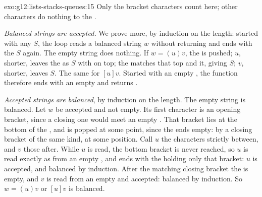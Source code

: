 \begin{solution}{exo:g12:lists-stacks-queues:15}
Only the bracket characters count here; other characters do nothing to the .

\emph{Balanced strings are accepted.} We prove more, by induction on the length: started with any  $S$, the loop
reads a balanced string $w$ without returning  and ends with the  $S$ again. The empty string does
nothing. If $w = (u)v$, the \code{(} is pushed; $u$, shorter, leaves the  as $S$ with \code{(} on top; the
\code{)} matches that top and  it, giving $S$; $v$, shorter, leaves $S$. The same for $[u]v$. Started with an
empty , the function therefore ends with an empty  and returns .

\emph{Accepted strings are balanced}, by induction on the length. The empty string is balanced. Let $w$ be accepted
and not empty. Its first character is an opening bracket, since a closing one would meet an empty . That bracket
lies at the bottom of the , and is popped at some point, since the  ends empty: by a closing bracket of the
same kind, at some position. Call $u$ the characters strictly between, and $v$ those after. While $u$ is read, the
bottom bracket is never reached, so $u$ is read exactly as from an empty , and ends with the  holding only
that bracket: $u$ is accepted, and balanced by induction. After the matching closing bracket the  is empty, and
$v$ is read from an empty  and accepted: balanced by induction. So $w = (u)v$ or $[u]v$ is balanced.
\end{solution}

